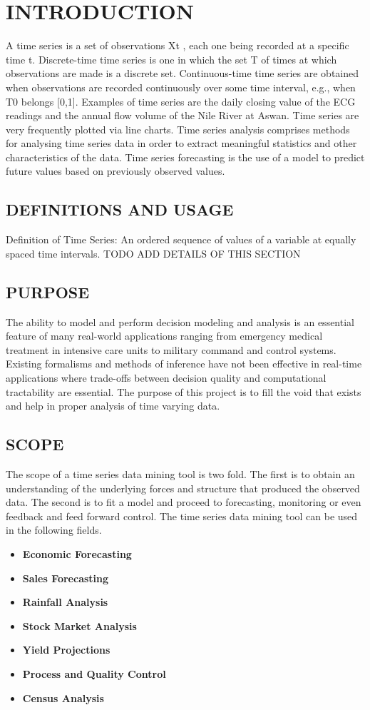 \documentclass[12pt]{report}
\begin{document}
\chapter{INTRODUCTION}
A time series is a set of observations Xt , each one being recorded at a specific time t. Discrete-time time series is one in which the set T of times at which observations are made is a discrete set. Continuous-time time series are obtained when observations are recorded continuously over some time interval, e.g., when T0 belongs [0,1]. Examples of time series are the daily closing value of the ECG readings and the annual flow volume of the Nile River at Aswan. Time series are very frequently plotted via line charts. Time series analysis comprises methods for analysing time series data in order to extract meaningful statistics and other characteristics of the data. Time series forecasting is the use of a model to predict future values based on previously observed values.  
\section{DEFINITIONS AND USAGE}
Definition of Time Series: An ordered sequence of values of a variable at equally spaced time intervals.
\@ TODO ADD DETAILS OF THIS SECTION
\section{PURPOSE}
The ability to model and perform decision modeling and analysis is an essential feature of many real-world applications ranging from emergency medical treatment in intensive care units to military command and control systems. Existing formalisms and methods of inference have not been effective in real-time applications where trade-offs between decision quality and computational tractability are essential. The purpose of this project is to fill the void that exists and help in proper analysis of time varying data.

\section{SCOPE}
The scope of a time series data mining tool is two fold. The first  is to obtain an understanding of the underlying forces and structure that produced the observed data. The second is to 
fit a model and proceed to forecasting, monitoring or even feedback and feed forward control. The time series data mining tool can be used in the following fields. 
\begin{itemize}
\item{\textbf{Economic Forecasting}}
\item{\textbf{Sales Forecasting}}
\item{\textbf{Rainfall Analysis}}
\item{\textbf{Stock Market Analysis}}
\item{\textbf{Yield Projections}}
\item{\textbf{Process and Quality Control}}
\item{\textbf{Census Analysis}}

\end{itemize}
\end{document}
